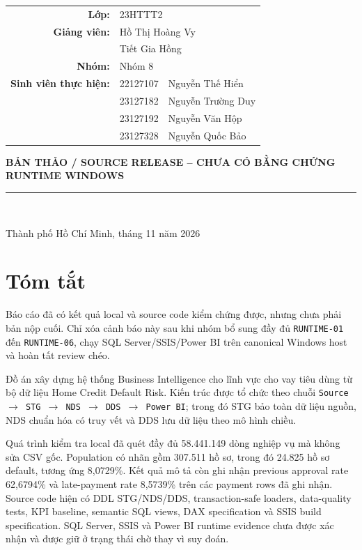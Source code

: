 \documentclass[12pt,a4paper,oneside]{report}
\newcommand{\evidence}[1]{\texttt{#1}}
\begin{document}
\begin{titlepage}
\vspace{1.2em}
\begin{tabular}{@{}rll@{}}
  \textbf{Lớp:} & \multicolumn{2}{l}{23HTTT2} \\[0.35em]
  \textbf{Giảng viên:} & \multicolumn{2}{l}{Hồ Thị Hoàng Vy} \\
                       & \multicolumn{2}{l}{Tiết Gia Hồng} \\[0.35em]
  \textbf{Nhóm:} & \multicolumn{2}{l}{Nhóm 8} \\[0.35em]
  \textbf{Sinh viên thực hiện:} & 22127107 & Nguyễn Thế Hiển \\
                                & 23127182 & Nguyễn Trường Duy \\
                                & 23127192 & Nguyễn Văn Hộp \\
                                & 23127328 & Nguyễn Quốc Bảo \\
  \end{tabular}

\vfill
{\color{Rose}\bfseries BẢN THẢO / SOURCE RELEASE -- CHƯA CÓ BẰNG CHỨNG RUNTIME WINDOWS\par}
\vspace{0.55em}
\rule{0.92\textwidth}{1.25pt}\\[0.7em]
{\large Thành phố Hồ Chí Minh, tháng 11 năm 2026\par}
\end{titlepage}

\chapter*{Tóm tắt}
\begin{draftbox}
Báo cáo đã có kết quả local và source code kiểm chứng được, nhưng chưa phải bản nộp cuối. Chỉ xóa cảnh báo này sau khi nhóm bổ sung đầy đủ \evidence{RUNTIME-01} đến \evidence{RUNTIME-06}, chạy SQL Server/SSIS/Power BI trên canonical Windows host và hoàn tất review chéo.
\end{draftbox}

Đồ án xây dựng hệ thống Business Intelligence cho lĩnh vực cho vay tiêu dùng từ bộ dữ liệu Home Credit Default Risk. Kiến trúc được tổ chức theo chuỗi \texttt{Source $\rightarrow$ STG $\rightarrow$ NDS $\rightarrow$ DDS $\rightarrow$ Power BI}; trong đó STG bảo toàn dữ liệu nguồn, NDS chuẩn hóa có truy vết và DDS lưu dữ liệu theo mô hình chiều.

Quá trình kiểm tra local đã quét đầy đủ 58.441.149 dòng nghiệp vụ mà không sửa CSV gốc. Population có nhãn gồm 307.511 hồ sơ, trong đó 24.825 hồ sơ default, tương ứng 8,0729\%. Kết quả mô tả còn ghi nhận previous approval rate 62,6794\% và late-payment rate 8,5739\% trên các payment rows đã ghi nhận. Source code hiện có DDL STG/NDS/DDS, transaction-safe loaders, data-quality tests, KPI baseline, semantic SQL views, DAX specification và SSIS build specification. SQL Server, SSIS và Power BI runtime evidence chưa được xác nhận và được giữ ở trạng thái chờ thay vì suy đoán.
\end{document}
